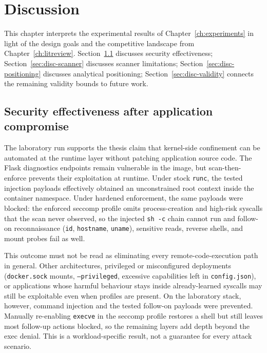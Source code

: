 
\chapter{Discussion}\label{ch:discussion}

This chapter interprets the experimental results of Chapter~\ref{ch:experiments} in light of the design goals and the competitive landscape from Chapter~\ref{ch:litreview}. Section~\ref{sec:disc-security} discusses security effectiveness; Section~\ref{sec:disc-scanner} discusses scanner limitations; Section~\ref{sec:disc-positioning} discusses analytical positioning; Section~\ref{sec:disc-validity} connects the remaining validity bounds to future work.

\section{Security effectiveness after application compromise}\label{sec:disc-security}

The laboratory run supports the thesis claim that kernel-side confinement can be automated at the runtime layer without patching application source code. The Flask diagnostics endpoints remain vulnerable in the image, but scan-then-enforce prevents their exploitation at runtime. Under stock \texttt{runc}, the tested injection payloads effectively obtained an unconstrained root context inside the container namespace. Under hardened enforcement, the same payloads were blocked: the enforced seccomp profile omits process-creation and high-risk syscalls that the scan never observed, so the injected \texttt{sh -c} chain cannot run and follow-on reconnaissance (\texttt{id}, \texttt{hostname}, \texttt{uname}), sensitive reads, reverse shells, and mount probes fail as well.

This outcome must not be read as eliminating every remote-code-execution path in general. Other architectures, privileged or misconfigured deployments (\texttt{docker.sock} mounts, \texttt{--privileged}, excessive capabilities left in \texttt{config.json}), or applications whose harmful behaviour stays inside already-learned syscalls may still be exploitable even when profiles are present. On the laboratory stack, however, command injection and the tested follow-on payloads were prevented. Manually re-enabling \texttt{execve} in the seccomp profile restores a shell but still leaves most follow-up actions blocked, so the remaining layers add depth beyond the exec denial. This is a workload-specific result, not a guarantee for every attack scenario.

